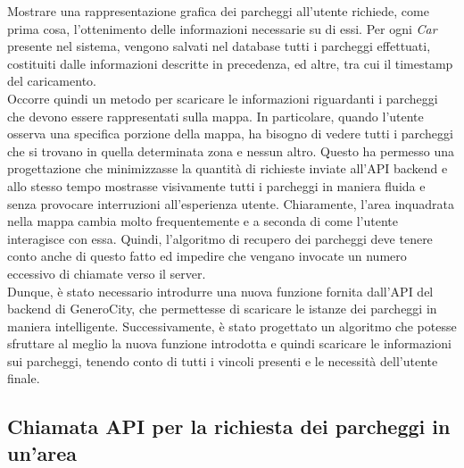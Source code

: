Mostrare una rappresentazione grafica dei parcheggi all'utente richiede, come prima cosa,
l'ottenimento delle informazioni necessarie su di essi. Per ogni \emph{Car} presente nel 
sistema, vengono salvati nel database tutti i parcheggi effettuati, costituiti dalle 
informazioni descritte in precedenza, ed altre, tra cui il timestamp del caricamento.\\
Occorre quindi un metodo per scaricare le informazioni riguardanti i parcheggi che 
devono essere rappresentati sulla mappa. In particolare, quando l'utente osserva una
specifica porzione della mappa, ha bisogno di vedere tutti i parcheggi che si trovano 
in quella determinata zona e nessun altro. Questo ha permesso una progettazione che 
minimizzasse la quantità di richieste inviate all'API backend e allo stesso tempo 
mostrasse visivamente tutti i parcheggi in maniera fluida e senza provocare
interruzioni all'esperienza utente. Chiaramente, l'area inquadrata nella mappa 
cambia molto frequentemente e a seconda di come l'utente interagisce con essa. 
Quindi, l'algoritmo di recupero dei parcheggi deve tenere conto anche di questo fatto
ed impedire che vengano invocate un numero eccessivo di chiamate verso il server.\\
Dunque, è stato necessario introdurre una nuova funzione fornita dall'API del backend
di GeneroCity, che permettesse di scaricare le istanze dei parcheggi in maniera
intelligente. Successivamente, è stato progettato un algoritmo che potesse sfruttare
al meglio la nuova funzione introdotta e quindi scaricare le informazioni sui parcheggi,
tenendo conto di tutti i vincoli presenti e le necessità dell'utente finale.

\subsection{Chiamata API per la richiesta dei parcheggi in un'area}

